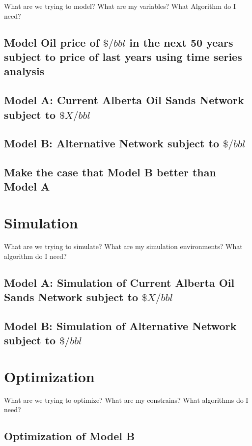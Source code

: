 \documentclass[12pt]{article}
\begin{document}
What are we trying to model? What are my variables? What Algorithm do I need?
\subsection{Model Oil price of $\$/bbl$ in the next 50 years subject to price of last years using time series analysis}
\subsection{Model A: Current Alberta Oil Sands Network subject to $\$X/bbl$}
\subsection{Model B: Alternative Network subject to $\$/bbl$}
\subsection{Make the case that Model B better than Model A}

\section{Simulation}
What are we trying to simulate? What are my simulation environments? What algorithm do I need?

\subsection{Model A: Simulation of Current Alberta Oil Sands Network subject to $\$X/bbl$}
\subsection{Model B: Simulation of Alternative Network subject to $\$/bbl$}


\section{Optimization}
What are we trying to optimize? What are my constrains? What algorithms do I need?

\subsection{Optimization of Model B}
\end{document}
